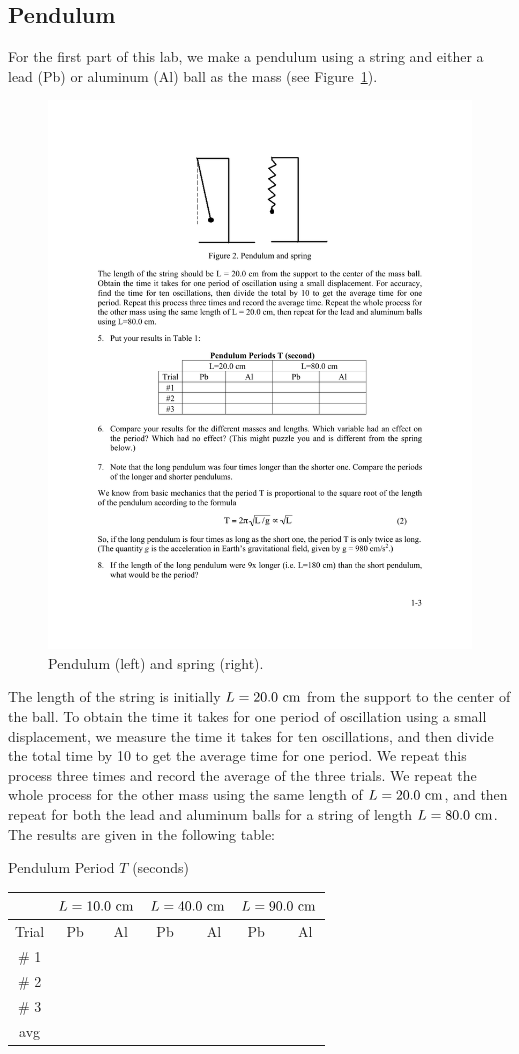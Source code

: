\documentclass[11pt]{NSF}
\begin{document}
\subsection{Pendulum}

For the first part of this lab, we make a pendulum using a 
string and either a lead (Pb) or aluminum (Al) ball as the
mass (see Figure~\ref{f:2}).
%
\begin{figure}[hbtp]
\begin{center}
\includegraphics[width=.5\textwidth]{fig1_2}
\caption{Pendulum (left) and spring (right).}
\label{f:2}
\end{center}
\end{figure}
%
The length of the string is initially $L = 20.0~{\rm cm}$ 
from the support to the center of the ball. 
To obtain the time it takes for one period of 
oscillation using a small displacement, we measure the 
time it takes for ten oscillations, and then divide 
the total time by 10 to get the average time for one period. 
We repeat this process three times and record the average 
of the three trials. 
We repeat the whole process for the other mass using 
the same length of $L = 20.0~{\rm cm}$, and 
then repeat for both the lead and aluminum balls for a
string of length $L=80.0~{\rm cm}$.
The results are given in the following table:
%
\begin{table}[hbtp]
\begin{center}
Pendulum Period $T$ (seconds)\\
\begin{tabular}{| c | c | c | c | c | c | c |}
\hline
&\multicolumn{2}{c}{$L=10.0~{\rm cm}$} \vrule
&\multicolumn{2}{c}{$L=40.0~{\rm cm}$} \vrule
&\multicolumn{2}{c}{$L=90.0~{\rm cm}$} \vrule\\
\hline
Trial & \phantom{ }Pb\phantom{ } & Al & \phantom{ }Pb\phantom{ }\  & Al & \phantom{ }Pb\phantom{ }\  & Al \\
\hline
\# 1 &  &  &  &  &  &  \\
\hline
\# 2  &  &  &  &  &  &  \\
\hline
\# 3  &  &  &  &  &  &  \\
\hline
avg   &  &  &  &  &  &  \\
\hline
\end{tabular}
\label{t:1}
\end{center}
\end{table}
\end{document}
